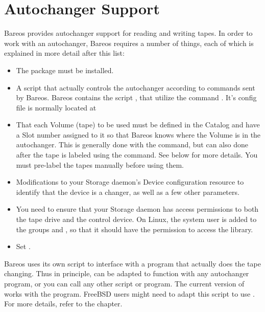 
\chapter{Autochanger Support}
\label{AutochangersChapter}

Bareos provides autochanger support for reading and writing tapes.  In
order to work with an autochanger, Bareos requires a number of things, each of
which is explained in more detail after this list:

\begin{itemize}
\item The package  must be installed.

\item A script that actually controls the autochanger according  to commands
   sent by Bareos. Bareos contains the script , that utilize the command .
   It's config file is normally located at 

\item That each Volume (tape) to be used must be defined in the Catalog and
   have a Slot number assigned to it so that Bareos knows where the Volume is
   in the autochanger. This is generally done with the  command, but
   can also done after the tape is labeled using the 
   command.  See below for more details. You must pre-label the tapes manually
   before using them.

\item Modifications to your Storage daemon's Device configuration  resource to
   identify that the device is a changer, as well  as a few other parameters.

\item You need to ensure that your Storage daemon
   has access permissions to both the tape drive and the control device.
   On Linux, the system user  is added to the groups  and ,
   so that it should have the permission to access the library.

\item Set .
\end{itemize}

Bareos uses its own  script to interface with a program
that actually does the tape changing.  Thus in principle, 
can be adapted to function with any autochanger program, or you can
call any other script or program. The current
version of  works with the  program.
FreeBSD users might need to adapt this script to use .
For more details, refer to the  chapter.

